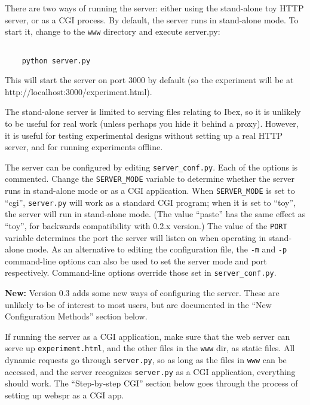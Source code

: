 \documentclass[11pt,letterpaper]{article}
\begin{document}
There are two ways of running the server: either using the stand-alone toy HTTP server,
or as a CGI process. By default, the server runs in stand-alone mode. To start
it, change to the \texttt{www} directory and execute server.py:
\footnotesize\begin{verbatim}

    python server.py
\end{verbatim}

\smallskip\noindent\normalsize

This will start the server on port 3000 by default (so the
experiment will be at http://localhost:3000/experiment.html).

The stand-alone server is limited to serving files relating to Ibex, so it is
unlikely to be useful for real work (unless perhaps you hide it behind a proxy).
However, it is useful for testing experimental designs without setting up a
real HTTP server, and for running experiments offline.

The server can be configured by editing \texttt{server\_conf.py}. Each of the
options is commented. Change the \texttt{SERVER\_MODE} variable to determine
whether the server runs in stand-alone mode or as a CGI
application. When \texttt{SERVER\_MODE} is set to ``cgi'', \texttt{server.py} will work
as a standard CGI program; when it is set to ``toy'', the server will
run in stand-alone mode. (The value ``paste'' has the same effect as
``toy'', for backwards compatibility with 0.2.x version.) The value of
the \texttt{PORT} variable determines the port the server will listen on when
operating in stand-alone mode. As an alternative to editing the
configuration file, the \texttt{-m} and \texttt{-p} command-line options can also be
used to set the server mode and port respectively. Command-line options
override those set in \texttt{server\_conf.py}.

\textbf{New:} Version 0.3 adds some new ways of configuring the server.
These are unlikely to be of interest to most users, but are documented
in the ``New Configuration Methods'' section below.

If running the server as a CGI application, make sure that the web
server can serve up \texttt{experiment.html}, and the other files in the
\texttt{www} dir, as static files. All dynamic requests go through
\texttt{server.py}, so as long as the files in \texttt{www} can be accessed, and the
server recognizes \texttt{server.py} as a CGI application, everything should
work. The ``Step-by-step CGI'' section below goes through the process
of setting up webspr as a CGI app.
\end{document}
